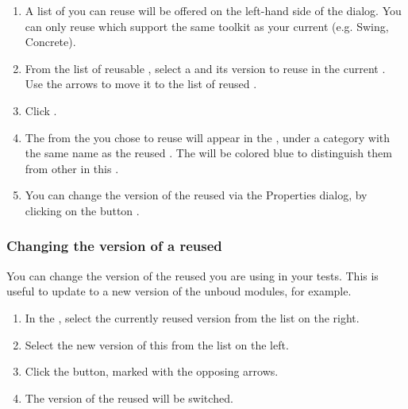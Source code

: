 \begin{enumerate}
\item A list of \gdprojects{} you can reuse will be offered on the left-hand side of the dialog. You can only reuse \gdprojects{} which support the same toolkit as your current \gdproject{} (e.g. Swing, Concrete).

\item From the list of reusable \gdprojects{}, select a \gdproject{} and its version to reuse in the current \gdproject{}. Use the arrows to move it to the list of reused \gdprojects{}.
\item Click . 
\item The \gdcases{} from the \gdproject{} you chose to reuse will appear in the \gdtestcasebrowser{}, under a category with the same name as the reused \gdproject{}. The \gdcases{} will be colored blue to distinguish them from other \gdcases{} in this \gdproject{}. 

\item You can change the version of the reused \gdproject{} via the  Properties dialog, by clicking on the  button .
\end{enumerate}

\subsubsection{Changing the version of a reused \gdproject{}}
\label{changingreusedprojectversion}
You can change the version of the reused \gdproject{} you are using in your tests. This is useful to update to a new version of the unboud modules, for example. 
\begin{enumerate}
\item In the , select the currently reused \gdproject{} version from the list on the right. 
\item Select the new version of this \gdproject{} from the list on the left. 
\item Click the  button, marked with the opposing arrows. 
\item The version of the reused \gdproject{} will be switched. 
\end{enumerate}
